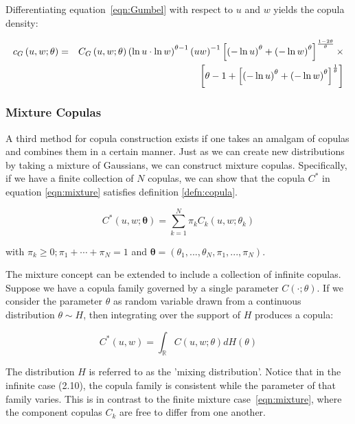 \documentclass[12pt]{article}
\begin{document}
Differentiating equation~\ref{eqn:Gumbel} with respect to $u$ and $w$ yields the copula density:

\begin{eqnarray}
	c_{G}\left(u,w;\theta\right) &=& C_{G}\left(u,w;\theta\right)\left(\ln u\cdot\ln w\right)^{\theta -1}\left(uw\right)^{-1}\left[\left(-\ln u\right)^{\theta}+\left(-\ln w\right)^{\theta}\right]^{\frac{1-2\theta}{\theta}}\times  \notag \\
	&& \left[\theta -1+\left[\left(-\ln u\right)^{\theta}+\left(-\ln w\right)^{\theta}\right]^{\frac{1}{\theta}}\right]
\end{eqnarray}

\subsubsection{Mixture Copulas} \label{sec:mixtureCopula}

A third method for copula construction exists if one takes an amalgam of copulas and combines them in a certain manner. Just as we can create new distributions by taking a mixture of Gaussians, we can construct mixture copulas. Specifically, if we have a finite collection of $N$ copulas, we can show that the copula $C^{\ast}$ in equation \ref{eqn:mixture} satisfies definition \ref{defn:copula}.

\begin{equation} \label{eqn:mixture}
    C^{\ast} \left(u, w; \boldsymbol{\theta} \right) = \sum_{k=1}^{N} \pi_{k} C_{k} \left(u, w; \theta _{k} \right)
\end{equation}

with $\pi _{k} \geq 0; \pi_{1} + \cdots + \pi_{N} = 1$ and $\boldsymbol{\theta} = \left(\theta_{1}, ..., \theta_{N}, \pi_{1}, ..., \pi_{N} \right)$.

The mixture concept can be extended to include a collection of infinite copulas. Suppose we have a copula family governed by a single parameter $C\left(\cdot;\theta\right)$. If we consider the parameter $\theta$ as random variable drawn from a continuous distribution $\theta\sim H$, then integrating over the support of $H$ produces a copula:

\begin{equation}
	C^{\ast}\left( u,w\right) =\int_{\mathbb{R}}C\left(u,w;\theta\right)dH\left(\theta\right)
\end{equation}

The distribution $H$ is referred to as the 'mixing distribution'. Notice that in the infinite case (2.10), the copula family is consistent while the parameter of that family varies. This is in contrast to the finite mixture case~\ref{eqn:mixture}, where the component copulas $C_{k}$ are free to differ from one another.
\end{document}
